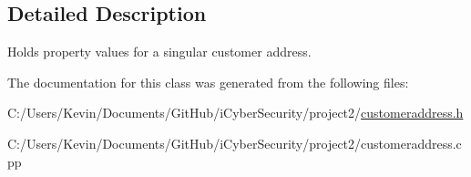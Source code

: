 \subsection{Detailed Description}
Holds property values for a singular customer address. 

The documentation for this class was generated from the following files\+:\begin{DoxyCompactItemize}
\item 
C\+:/\+Users/\+Kevin/\+Documents/\+Git\+Hub/i\+Cyber\+Security/project2/\mbox{\hyperlink{customeraddress_8h}{customeraddress.\+h}}\item 
C\+:/\+Users/\+Kevin/\+Documents/\+Git\+Hub/i\+Cyber\+Security/project2/customeraddress.\+cpp\end{DoxyCompactItemize}
